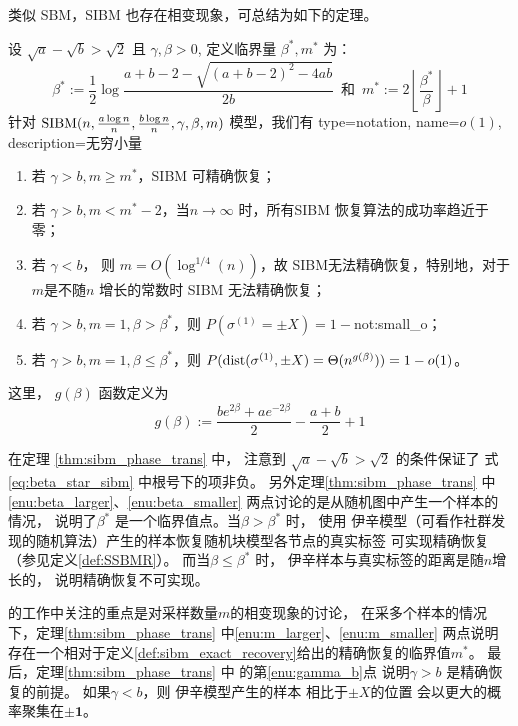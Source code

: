 类似 SBM，SIBM 也存在相变现象，可总结为如下的定理。
\begin{theorem}\label{thm:sibm_phase_trans}
  设 $\sqrt{a} - \sqrt{b} > \sqrt{2}$ 且 $\gamma, \beta > 0$,
  定义临界量 $\beta^*, m^*$ 为：
  \begin{equation}\label{eq:beta_star_sibm}
    \beta^* :=  \frac{1}{2} \log \frac{a+b-2 - \sqrt{(a+b-2)^2-4ab}}{2b}
    \, \textrm{ 和 } \,
    m^* := 2\left\lfloor\frac{\beta^*}{\beta} \right\rfloor + 1
  \end{equation}
  针对 $\operatorname{SIBM}(n, \frac{a \log n}{n}, \frac{b \log n}{n}, \gamma, \beta, m)$ 模型，我们有
{
  type=notation,
  name={$o(1)$},
  description={无穷小量}
}
  \begin{enumerate}
    \item\label{enu:m_larger} 若 $\gamma > b, m \geq m^*$，SIBM 可精确恢复；
    \item\label{enu:m_smaller} 若 $\gamma >b, m < m^*-2$，当$n\to \infty$ 时，所有SIBM 恢复算法的成功率趋近于零；
    \item\label{enu:gamma_b} 若 $ \gamma < b$， 则 $ m = O(\log^{1/4}(n))$，故 SIBM无法精确恢复，特别地，对于$m$是不随$n$
    增长的常数时 SIBM 无法精确恢复；
    \item\label{enu:beta_larger}  若 $\gamma>b, m=1, \beta > \beta^*$，则 $P(\sigma^{(1)}=\pm X) = 1-$\gls{not:small_o}；
    \item\label{enu:beta_smaller}  若 $\gamma>b, m=1, \beta \leq \beta^*$，则
    $P(\operatorname{dist}(\sigma^{(1)}, \pm X) =
    \Theta(n^{g(\beta)}))=1-o(1)$。
  \end{enumerate}
  这里， $g(\beta)$ 函数定义为
  \begin{equation}
    g(\beta):= \frac{be^{2\beta} + a e^{-2\beta}}{2} - \frac{a+b}{2} +1
  \end{equation}
\end{theorem}
在定理 \ref{thm:sibm_phase_trans} 中，
注意到 $\sqrt{a} - \sqrt{b} > \sqrt{2}$ 的条件保证了
式\ref{eq:beta_star_sibm} 中根号下的项非负。
另外定理\ref{thm:sibm_phase_trans} 中\ref{enu:beta_larger}、\ref{enu:beta_smaller}
两点讨论的是从随机图中产生一个样本的情况，
说明了$\beta^*$ 是一个临界值点。当$\beta>\beta^*$ 时，
使用 伊辛模型（可看作社群发现的随机算法）产生的样本恢复随机块模型各节点的真实标签
可实现精确恢复（参见定义\ref{def:SSBMR}）。
而当$\beta\leq \beta^*$ 时， 伊辛样本与真实标签的距离是随$n$增长的，
说明精确恢复不可实现。

\citet{ye2020exact} 的工作中关注的重点是对采样数量$m$的相变现象的讨论，
在采多个样本的情况下，定理\ref{thm:sibm_phase_trans} 中\ref{enu:m_larger}、\ref{enu:m_smaller}
两点说明存在一个相对于定义\ref{def:sibm_exact_recovery}给出的精确恢复的临界值$m^*$。
最后，定理\ref{thm:sibm_phase_trans} 中
的第\ref{enu:gamma_b}点
说明$\gamma>b$
是精确恢复的前提。
如果$\gamma<b$，则
伊辛模型产生的样本
相比于$\pm X$的位置
会以更大的概率聚集在$\pm \bm{1}$。

